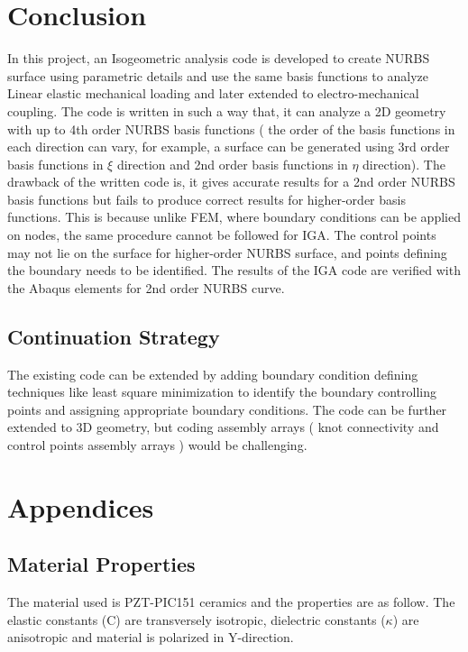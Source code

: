 \documentclass[11pt]{article}
\begin{document}
\section{Conclusion}
In this project, an Isogeometric analysis code is developed to create NURBS surface using parametric details and use the same basis functions to analyze Linear elastic mechanical loading and later extended to electro-mechanical coupling. The code is written in such a way that, it can analyze a 2D geometry with up to 4th order NURBS basis functions ( the order of the basis functions in each direction can vary, for example, a surface can be generated using 3rd order basis functions in $\xi$ direction and 2nd order basis functions in $\eta$ direction). The drawback of the written code is, it gives accurate results for a 2nd order NURBS basis functions but fails to produce correct results for higher-order basis functions. This is because unlike FEM, where boundary conditions can be applied on nodes, the same procedure cannot be followed for IGA.  The control points may not lie on the surface for higher-order NURBS surface, and points defining the boundary needs to be identified. The results of the IGA code are verified with the Abaqus elements for 2nd order NURBS curve.

\subsection{Continuation Strategy}

The existing code can be extended by adding boundary condition defining techniques like least square minimization to identify the boundary controlling points and assigning appropriate boundary conditions. The code can be further extended to 3D geometry, but coding assembly arrays ( knot connectivity and control points assembly arrays ) would be challenging.


\newpage
\section{Appendices}

\subsection{Material Properties} \label{MaterialProps}
The material used is
PZT-PIC151 ceramics and the properties \cite{kozinov2018simulation} are as follow. The elastic constants (C) are transversely isotropic, dielectric constants ($\kappa$) are anisotropic and material is polarized in Y-direction. 
\end{document}
